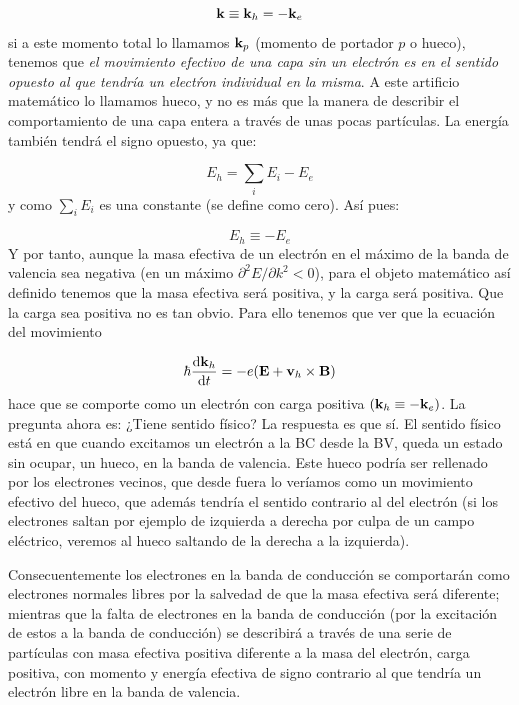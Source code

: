 \begin{equation}
	\mathbf{k} \equiv \mathbf{k}_h = - \mathbf{k}_e
\end{equation}
si a este momento total lo llamamos $\mathbf{k}_p$ (momento de portador $p$ o hueco), tenemos que \textit{el movimiento efectivo de una capa sin un electrón es en el sentido opuesto al que tendría un electŕon individual en la misma}. A este artificio matemático lo llamamos hueco, y no es más que la manera de describir el comportamiento de una capa entera a través de unas pocas partículas. La energía también tendrá el signo opuesto, ya que:

\begin{equation}
	E_h = \sum_{i} E_i - E_e 
\end{equation}
y como $\sum_{i}E_i$ es una constante (se define como cero). Así pues:

\begin{equation}
	E_h \equiv - E_e
\end{equation}
Y por tanto, aunque la masa efectiva de un electrón en el máximo de la banda de valencia sea negativa (en un máximo $\partial^2 E/ \partial k^2<0$), para el objeto matemático así definido tenemos que la masa efectiva será positiva, y la carga será positiva. Que la carga sea positiva no es tan obvio. Para ello tenemos que ver que la ecuación del movimiento 

\begin{equation}
	\hbar \frac{\mathrm{d} \mathbf{k}_h}{\mathrm{d} t} = -e(\mathbf{E} + \mathbf{v}_h \times \mathbf{B})
\end{equation}
hace que se comporte como un electrón con carga positiva $(\mathbf{k}_h \equiv - \mathbf{k}_e)$. La pregunta ahora es: ¿Tiene sentido físico? La respuesta es que sí. El sentido físico está en que cuando excitamos un electrón a la BC desde la BV, queda un estado sin ocupar, un hueco, en la banda de valencia. Este hueco podría ser rellenado por los electrones vecinos, que desde fuera lo veríamos como un movimiento efectivo del hueco, que además tendría el sentido contrario al del electrón (si los electrones saltan por ejemplo de izquierda a derecha por culpa de un campo eléctrico, veremos al hueco saltando de la derecha a la izquierda). 

Consecuentemente los electrones en la banda de conducción se comportarán como electrones normales libres por la salvedad de que la masa efectiva será diferente; mientras que la falta de electrones en la banda de conducción (por la excitación de estos a la banda de conducción) se describirá a través de una serie de partículas con masa efectiva positiva diferente a la masa del electrón, carga positiva, con momento y energía efectiva de signo contrario al que tendría un electrón libre en la banda de valencia.


